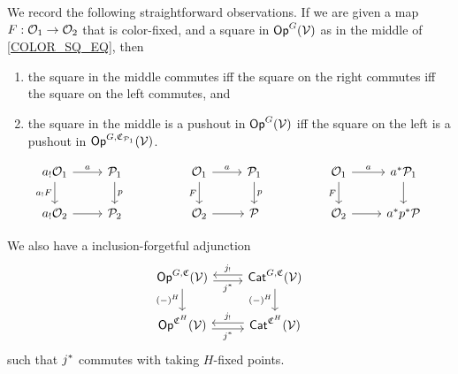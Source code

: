 \documentclass[a4paper,10pt
,draft
]{article}%
\renewcommand{\1}{\eta}%
\begin{document}
\begin{remark}
      \label{COLOR_SQ_REM}
      We record the following straightforward observations.
      If we are given a map $F: \mathcal{O}_1 \to \mathcal{O}_2$ that is color-fixed,
      and a square in $\mathsf{Op}^G(\mathcal V)$ as in the middle of \ref{COLOR_SQ_EQ}, then
      \begin{enumerate}[label = (\roman*)]
      \item the square in the middle commutes iff the square on the right commutes iff the square on the left commutes, and
      \item the square in the middle is a pushout in $\mathsf{Op}^G(\mathcal V)$ iff
            the square on the left is a pushout in $\mathsf{Op}^{G, \mathfrak C_{\mathcal{P}_1}}(\mathcal V)$.
      \end{enumerate}
      \begin{equation}
            \label{COLOR_SQ_EQ}
            \begin{tikzcd}
                  a_! \O_1 \arrow[d, "a_! F"'] \arrow[r, "a"]
                  &
                  \P_1 \arrow[d, "p"]
                  &&
                  \O_1 \arrow[d, "F"'] \arrow[r, "a"]
                  &
                  \P_1 \arrow[d, "p"]
                  &&
                  \O_1 \arrow[d, "F"'] \arrow[r, "a"]
                  &
                  a^{\**} \P_1 \arrow[d]
                  \\
                  a_! \O_2 \arrow[r]
                  &
                  \P_2
                  &&
                  \O_2 \arrow[r]
                  &
                  \P
                  &&
                  \O_2 \arrow[r]
                  &
                  a^{\**} p^{\**} \P
            \end{tikzcd}
      \end{equation}
\end{remark}

\begin{remark}
      We also have a inclusion-forgetful adjunction
      \begin{equation}
            \label{JSTAR_CAT_EQ}
            \begin{tikzcd}
                  \Op^{G, \mathfrak C}(\V) \arrow[r, shift right, "j^{\**}"'] \arrow[d, "{(-)^H}"']
                  &
                  \Cat^{G, \mathfrak C}(\V) \arrow[l, shift right, "j_!"'] \arrow[d, "{(-)^H}"']
                  \\
                  \Op^{\mathfrak C^H}(\V)  \arrow[r, shift right, "j^{\**}"']
                  &
                  \Cat^{\mathfrak C^H}(\V) \arrow[l, shift right, "j_!"']
            \end{tikzcd}
      \end{equation}
      such that $j^{\**}$ commutes with taking $H$-fixed points.
\end{remark}
\end{document}
